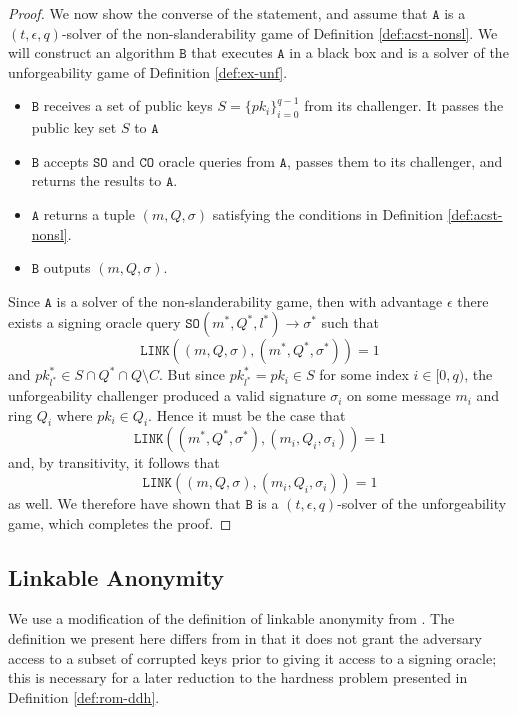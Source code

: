 \documentclass{llncs}
\newcommand{\A}{\texttt{A}}
\newcommand{\B}{\texttt{B}}
\begin{document}
\begin{proof}
    We now show the converse of the statement, and assume that $\A$ is a $(t,\epsilon,q)$-solver of the non-slanderability game of Definition \ref{def:acst-nonsl}. We will construct an algorithm $\B$ that executes $\A$ in a black box and is a solver of the unforgeability game of Definition \ref{def:ex-unf}.
    \begin{itemize}
        \item $\B$ receives a set of public keys $S = \{pk_i\}_{i=0}^{q-1}$ from its challenger. It passes the public key set $S$ to $\A$
        \item $\B$ accepts $\texttt{SO}$ and $\texttt{CO}$ oracle queries from $\A$, passes them to its challenger, and returns the results to $\A$.
        \item $\A$ returns a tuple $(m,Q,\sigma)$ satisfying the conditions in Definition \ref{def:acst-nonsl}.
        \item $\B$ outputs $(m,Q,\sigma)$.
    \end{itemize}
    Since $\A$ is a solver of the non-slanderability game, then with advantage $\epsilon$ there exists a signing oracle query $\texttt{SO}(m^*,Q^*,l^*) \to \sigma^*$ such that $$\texttt{LINK}((m,Q,\sigma),(m^*,Q^*,\sigma^*)) = 1$$ and $pk_{l^*}^* \in S \cap Q^* \cap Q \setminus C$. But since $pk_{l^*}^* = pk_i \in S$ for some index $i \in [0,q)$, the unforgeability challenger produced a valid signature $\sigma_i$ on some message $m_i$ and ring $Q_i$ where $pk_i \in Q_i$. Hence it must be the case that $$\texttt{LINK}((m^*,Q^*,\sigma^*),(m_i,Q_i,\sigma_i)) = 1$$ and, by transitivity, it follows that $$\texttt{LINK}((m,Q,\sigma),(m_i,Q_i,\sigma_i)) = 1$$ as well. We therefore have shown that $\B$ is a $(t,\epsilon,q)$-solver of the unforgeability game, which completes the proof.
\end{proof}

\subsection{Linkable Anonymity}

We use a modification of the definition of linkable anonymity from \cite{backes2019ring}. The definition we present here differs from \cite{backes2019ring} in that it does not grant the adversary access to a subset of corrupted keys prior to giving it access to a signing oracle; this is necessary for a later reduction to the hardness problem presented in Definition \ref{def:rom-ddh}.
\end{document}

